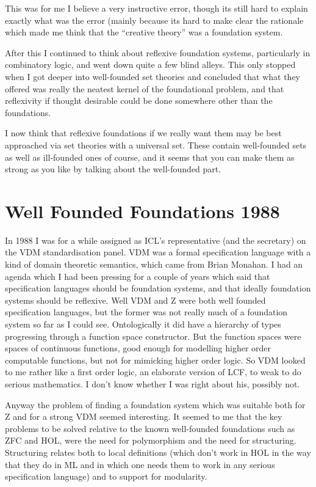 \documentclass[10pt,titlepage]{book}
\begin{document}
This was for me I believe a very instructive error, though its still hard to explain exactly what was the error (mainly because its hard to make clear the rationale which made me think that the ``creative theory'' was a foundation system.

After this I continued to think about reflexive foundation systems, particularly in combinatory logic, and went down quite a few blind alleys.
This only stopped when I got deeper into well-founded set theories and concluded that what they offered was really the neatest kernel of the foundational problem, and that reflexivity if thought desirable could be done somewhere other than the foundations.

I now think that reflexive foundations if we really want them may be best approached via set theories with a universal set.
These contain well-founded sets as well as ill-founded ones of course, and it seems that you can make them as strong as you like by talking about the well-founded part.

\section{Well Founded Foundations 1988}

In 1988 I was for a while assigned as ICL's representative (and the secretary) on the VDM standardisation panel.
VDM was a formal specification language with a kind of domain theoretic semantics, which came from Brian Monahan.
I had an agenda which I had been pressing for a couple of years which said that specification languages should be foundation systems, and that ideally foundation systems should be reflexive.
Well VDM and Z were both well founded specification languages, but the former was not really much of a foundation system so far as I could see.
Ontologically it did have a hierarchy of types progressing through a function space constructor.
But the function spaces were spaces of continuous functions, good enough for modelling higher order computable functions, but not for mimicking higher order logic.
So VDM looked to me rather like a first order logic, an elaborate version of LCF, to weak to do serious mathematics.
I don't know whether I was right about his, possibly not.

Anyway the problem of finding a foundation system which was suitable both for Z and for a strong VDM seemed interesting.
It seemed to me that the key problems to be solved relative to the known well-founded foundations such as ZFC and HOL, were the need for polymorphism and the need for structuring.
Structuring relates both to local definitions (which don't work in HOL in the way that they do in ML and in which one needs them to work in any serious specification language) and to support for modularity.
\end{document}
